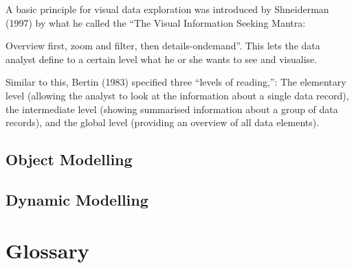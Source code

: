 \documentclass[twoside, english, draft]{Pflichtenheft}
\begin{document}
 A basic principle for visual data exploration was introduced by Shneiderman (1997) by what he called the “The Visual Information Seeking Mantra: 

Overview first, zoom and filter, then details-ondemand”.
This lets the data analyst define to a certain level what he or she wants
to see and visualise. 

Similar to this, Bertin (1983) specified three “levels of reading,”:
The elementary level (allowing the analyst to look at the information about a
single data record), the intermediate level (showing summarised information about a group of data records), and the global level (providing an overview of all data elements).

\subsection{Object Modelling}
\subsection{Dynamic Modelling}

\section{Glossary}
\printglossary[title=,toctitle=]



\printbibliography[heading=bibintoc]
\end{document}

